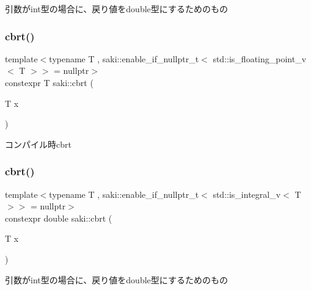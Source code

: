 引数がint型の場合に、戻り値をdouble型にするためのもの 

\mbox{\label{namespacesaki_a8836c929b71a61cf0151d3b76eb7af15}} 
\subsubsection{\texorpdfstring{cbrt()}{cbrt()}\hspace{0.1cm}{\footnotesize\ttfamily [1/2]}}
{\footnotesize\ttfamily template$<$typename T , saki\+::enable\+\_\+if\+\_\+nullptr\+\_\+t$<$ std\+::is\+\_\+floating\+\_\+point\+\_\+v$<$ T $>$$>$  = nullptr$>$ \\
constexpr T saki\+::cbrt (\begin{DoxyParamCaption}\item[{T}]{x }\end{DoxyParamCaption})}



コンパイル時cbrt 

\mbox{\label{namespacesaki_a5a3d1ab0508dcff1fb2e17a4ef8a855d}} 
\subsubsection{\texorpdfstring{cbrt()}{cbrt()}\hspace{0.1cm}{\footnotesize\ttfamily [2/2]}}
{\footnotesize\ttfamily template$<$typename T , saki\+::enable\+\_\+if\+\_\+nullptr\+\_\+t$<$ std\+::is\+\_\+integral\+\_\+v$<$ T $>$$>$  = nullptr$>$ \\
constexpr double saki\+::cbrt (\begin{DoxyParamCaption}\item[{T}]{x }\end{DoxyParamCaption})}



引数がint型の場合に、戻り値をdouble型にするためのもの 

\mbox{\label{namespacesaki_abd8c75003f2a213607842f5d82eac806}} 
